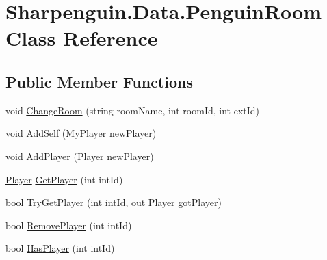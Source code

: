 \hypertarget{classSharpenguin_1_1Data_1_1PenguinRoom}{\section{\-Sharpenguin.\-Data.\-Penguin\-Room \-Class \-Reference}
\label{classSharpenguin_1_1Data_1_1PenguinRoom}
}
\subsection*{\-Public \-Member \-Functions}
\begin{DoxyCompactItemize}
\item 
void \hyperlink{classSharpenguin_1_1Data_1_1PenguinRoom_a6eb23989f397ce69a2365aff0ee42adb}{\-Change\-Room} (string room\-Name, int room\-Id, int ext\-Id)
\item 
void \hyperlink{classSharpenguin_1_1Data_1_1PenguinRoom_a1499f4cd3bd32d41e11c6a8cd0c70de4}{\-Add\-Self} (\hyperlink{classSharpenguin_1_1Data_1_1MyPlayer}{\-My\-Player} new\-Player)
\item 
void \hyperlink{classSharpenguin_1_1Data_1_1PenguinRoom_a25c1b2ce59c3cd19d90d3e4d76929788}{\-Add\-Player} (\hyperlink{classSharpenguin_1_1Data_1_1Player}{\-Player} new\-Player)
\item 
\hyperlink{classSharpenguin_1_1Data_1_1Player}{\-Player} \hyperlink{classSharpenguin_1_1Data_1_1PenguinRoom_a2b9490bdf704b051a9b1edcdaeb420ab}{\-Get\-Player} (int int\-Id)
\item 
bool \hyperlink{classSharpenguin_1_1Data_1_1PenguinRoom_aac8f948d0d296520efc706c6a22a2b11}{\-Try\-Get\-Player} (int int\-Id, out \hyperlink{classSharpenguin_1_1Data_1_1Player}{\-Player} got\-Player)
\item 
bool \hyperlink{classSharpenguin_1_1Data_1_1PenguinRoom_a2843fba06f2bd503a09a89e0e6ba87fa}{\-Remove\-Player} (int int\-Id)
\item 
bool \hyperlink{classSharpenguin_1_1Data_1_1PenguinRoom_ac0851db56a7e51dfa7a542483157eb8e}{\-Has\-Player} (int int\-Id)
\end{DoxyCompactItemize}
